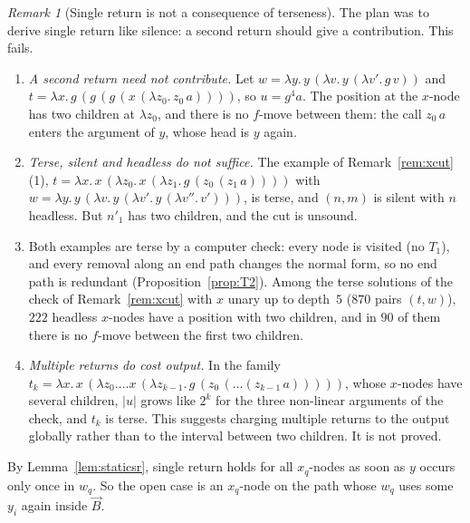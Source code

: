 \documentclass[11pt]{article}
\theoremstyle{plain}
\theoremstyle{definition}
\theoremstyle{remark}
\newtheorem{remark}[theorem]{Remark}
\begin{document}
\begin{remark}[Single return is not a consequence of terseness]\label{rem:srterse}
The plan was to derive single return like silence: a second return
should give a contribution.  This fails.
\begin{enumerate}
\item \emph{A second return need not contribute.}  Let
  $w=\lambda y.\,y\,(\lambda v.\,y\,(\lambda v'.\,g\,v))$ and
  $t=\lambda x.\,g\,(g\,(g\,(x\,(\lambda z_0.\,z_0\,a))))$, so
  $u=g^4a$.  The position at the $x$-node has two children at
  $\lambda z_0$, and there is no $f$-move between them: the call
  $z_0\,a$ enters the argument of $y$, whose head is $y$ again.
\item \emph{Terse, silent and headless do not suffice.}  The example of
  Remark~\ref{rem:xcut}(1),
  $t=\lambda x.\,x\,(\lambda z_0.\,x\,(\lambda z_1.\,g\,(z_0\,(z_1\,a))))$
  with $w=\lambda y.\,y\,(\lambda v.\,y\,(\lambda v'.\,y\,(\lambda
  v''.\,v')))$, is terse, and $(n,m)$ is silent with $n$ headless.  But
  $n'_1$ has two children, and the cut is unsound.
\item Both examples are terse by a computer check: every node is visited
  (no $T_1$), and every removal along an end path changes the normal
  form, so no end path is redundant (Proposition~\ref{prop:T2}).
  Among the terse solutions of the check of Remark~\ref{rem:xcut} with
  $x$ unary up to depth~$5$ ($870$ pairs $(t,w)$), $222$ headless
  $x$-nodes have a position with two children, and in $90$ of them
  there is no $f$-move between the first two children.
\item \emph{Multiple returns do cost output.}  In the family
  $t_k=\lambda x.\,x\,(\lambda z_0.\dots x\,(\lambda
  z_{k-1}.\,g\,(z_0\,(\dots(z_{k-1}\,a)))))$, whose $x$-nodes have
  several children, $|u|$ grows like $2^k$ for the three non-linear
  arguments of the check, and $t_k$ is terse.  This suggests charging
  multiple returns to the output globally rather than to the interval
  between two children.  It is not proved.
\end{enumerate}
By Lemma~\ref{lem:staticsr}, single return holds for all $x_q$-nodes as
soon as $y$ occurs only once in $w_q$.  So the open case is an $x_q$-node
on the path whose $w_q$ uses some $y_i$ again inside $\vec B$.
\end{remark}
\end{document}
